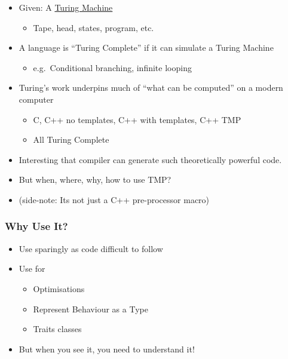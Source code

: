 \begin{itemize}
\itemsep1pt\parskip0pt
\item
  Given: A \href{http://en.wikipedia.org/wiki/Turing_machine}{Turing
  Machine}

  \begin{itemize}
  \itemsep1pt\parskip0pt
  \item
    Tape, head, states, program, etc.
  \end{itemize}
\item
  A language is ``Turing Complete'' if it can simulate a Turing Machine

  \begin{itemize}
  \itemsep1pt\parskip0pt
  \item
    e.g.~Conditional branching, infinite looping
  \end{itemize}
\item
  Turing's work underpins much of ``what can be computed'' on a modern
  computer

  \begin{itemize}
  \itemsep1pt\parskip0pt
  \item
    C, C++ no templates, C++ with templates, C++ TMP
  \item
    All Turing Complete
  \end{itemize}
\item
  Interesting that compiler can generate such theoretically powerful
  code.\\
\item
  But when, where, why, how to use TMP?\\
\item
  (side-note: Its not just a C++ pre-processor macro)
\end{itemize}

\subsubsection{Why Use It?}\label{why-use-it}

\begin{itemize}
\itemsep1pt\parskip0pt
\item
  Use sparingly as code difficult to follow
\item
  Use for

  \begin{itemize}
  \itemsep1pt\parskip0pt
  \item
    Optimisations
  \item
    Represent Behaviour as a Type
  \item
    Traits classes
  \end{itemize}
\item
  But when you see it, you need to understand it!
\end{itemize}

